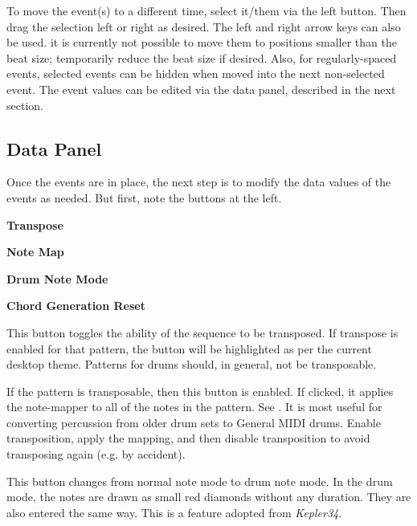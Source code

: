    To move the event(s) to a different time, select it/them via the left
   button.  Then drag the selection left or right as desired.
   The left and right arrow keys can also be used.
   it is currently not possible to move them to positions smaller than the
   beat size; temporarily reduce the beat size if desired.
   Also, for regularly-spaced events, selected events can be hidden when moved
   into the next non-selected event.
   The event values can be edited via the data panel, described in the next
   section.

\subsection{Data Panel}
\label{subsec:pattern_editor_data_view}

   Once the events are in place, the next step is to modify the
   data values of the events as needed.
   But first, note the buttons at the left.

   \begin{enumber}
      \item \textbf{Transpose}
      \item \textbf{Note Map}
      \item \textbf{Drum Note Mode}
      \item \textbf{Chord Generation Reset}
   \end{enumber}

   \setcounter{ItemCounter}{0}      %

   This button toggles the ability of the sequence to be transposed.
   If transpose is enabled for that pattern, the button will be highlighted as
   per the current desktop theme.  Patterns for drums should, in general, not
   be transposable.

   If the pattern is transposable, then this button is enabled.
   If clicked, it applies the note-mapper to all of the notes in the pattern.
   See .
   It is most useful for converting percussion from older drum sets to
   General MIDI drums.  Enable transposition, apply the mapping, and then
   disable transposition to avoid transposing again (e.g. by accident).

   This button changes from normal note mode to drum note mode. In the drum
   mode, the notes are drawn as small red diamonds without any duration.
   They are also entered the same way.
   This is a feature adopted from \textsl{Kepler34}.

